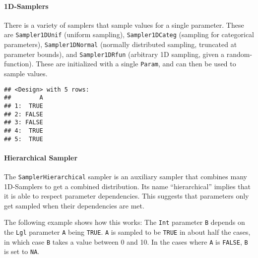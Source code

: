 \documentclass[
]{scrbook}
\newenvironment{Shaded}{\begin{snugshade}}{\end{snugshade}}
\newcommand{\DecValTok}[1]{\textcolor[rgb]{0.00,0.00,0.81}{#1}}
\newcommand{\FunctionTok}[1]{\textcolor[rgb]{0.00,0.00,0.00}{#1}}
\newcommand{\NormalTok}[1]{#1}
\newcommand{\OtherTok}[1]{\textcolor[rgb]{0.56,0.35,0.01}{#1}}
\newcommand{\SpecialCharTok}[1]{\textcolor[rgb]{0.00,0.00,0.00}{#1}}
\renewenvironment{Shaded} {\begin{snugshade}\small} {\end{snugshade}}
\begin{document}
\hypertarget{d-samplers}{%
\paragraph{1D-Samplers}\label{d-samplers}}

There is a variety of samplers that sample values for a single parameter.
These are \texttt{Sampler1DUnif} (uniform sampling), \texttt{Sampler1DCateg} (sampling for categorical parameters), \texttt{Sampler1DNormal} (normally distributed sampling, truncated at parameter bounds), and \texttt{Sampler1DRfun} (arbitrary 1D sampling, given a random-function).
These are initialized with a single \texttt{Param}, and can then be used to sample values.

\begin{Shaded}
\end{Shaded}

\begin{verbatim}
## <Design> with 5 rows:
##        A
## 1:  TRUE
## 2: FALSE
## 3: FALSE
## 4:  TRUE
## 5:  TRUE
\end{verbatim}

\hypertarget{hierarchical-sampler}{%
\paragraph{Hierarchical Sampler}\label{hierarchical-sampler}}

The \texttt{SamplerHierarchical} sampler is an auxiliary sampler that combines many 1D-Samplers to get a combined distribution.
Its name ``hierarchical'' implies that it is able to respect parameter dependencies.
This suggests that parameters only get sampled when their dependencies are met.

The following example shows how this works: The \texttt{Int} parameter \texttt{B} depends on the \texttt{Lgl} parameter \texttt{A} being \texttt{TRUE}.
\texttt{A} is sampled to be \texttt{TRUE} in about half the cases, in which case \texttt{B} takes a value between 0 and 10.
In the cases where \texttt{A} is \texttt{FALSE}, \texttt{B} is set to \texttt{NA}.
\end{document}
